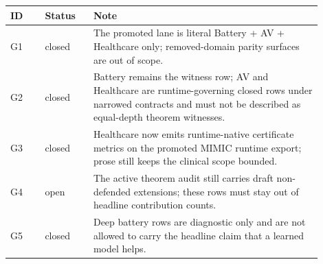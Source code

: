 \begin{tabular}{p{0.10\linewidth}p{0.14\linewidth}p{0.66\linewidth}}ID & Status & Note\\\midrule G1 & closed & The promoted lane is literal Battery + AV + Healthcare only; removed-domain parity surfaces are out of scope.\\G2 & closed & Battery remains the witness row; AV and Healthcare are runtime-governing closed rows under narrowed contracts and must not be described as equal-depth theorem witnesses.\\G3 & closed & Healthcare now emits runtime-native certificate metrics on the promoted MIMIC runtime export; prose still keeps the clinical scope bounded.\\G4 & open & The active theorem audit still carries draft non-defended extensions; these rows must stay out of headline contribution counts.\\G5 & closed & Deep battery rows are diagnostic only and are not allowed to carry the headline claim that a learned model helps.\\\end{tabular}
